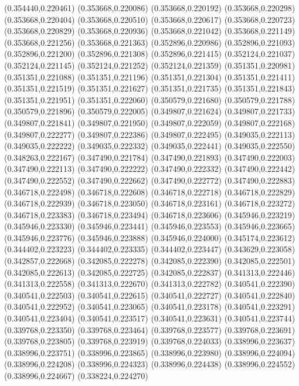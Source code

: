 (0.354440,0.220461)
(0.353668,0.220086)
(0.353668,0.220192)
(0.353668,0.220298)
(0.353668,0.220404)
(0.353668,0.220510)
(0.353668,0.220617)
(0.353668,0.220723)
(0.353668,0.220829)
(0.353668,0.220936)
(0.353668,0.221042)
(0.353668,0.221149)
(0.353668,0.221256)
(0.353668,0.221363)
(0.352896,0.220986)
(0.352896,0.221093)
(0.352896,0.221200)
(0.352896,0.221308)
(0.352896,0.221415)
(0.352124,0.221037)
(0.352124,0.221145)
(0.352124,0.221252)
(0.352124,0.221359)
(0.351351,0.220981)
(0.351351,0.221088)
(0.351351,0.221196)
(0.351351,0.221304)
(0.351351,0.221411)
(0.351351,0.221519)
(0.351351,0.221627)
(0.351351,0.221735)
(0.351351,0.221843)
(0.351351,0.221951)
(0.351351,0.222060)
(0.350579,0.221680)
(0.350579,0.221788)
(0.350579,0.221896)
(0.350579,0.222005)
(0.349807,0.221624)
(0.349807,0.221733)
(0.349807,0.221841)
(0.349807,0.221950)
(0.349807,0.222059)
(0.349807,0.222168)
(0.349807,0.222277)
(0.349807,0.222386)
(0.349807,0.222495)
(0.349035,0.222113)
(0.349035,0.222222)
(0.349035,0.222332)
(0.349035,0.222441)
(0.349035,0.222550)
(0.348263,0.222167)
(0.347490,0.221784)
(0.347490,0.221893)
(0.347490,0.222003)
(0.347490,0.222113)
(0.347490,0.222222)
(0.347490,0.222332)
(0.347490,0.222442)
(0.347490,0.222552)
(0.347490,0.222662)
(0.347490,0.222772)
(0.347490,0.222883)
(0.346718,0.222498)
(0.346718,0.222608)
(0.346718,0.222718)
(0.346718,0.222829)
(0.346718,0.222939)
(0.346718,0.223050)
(0.346718,0.223161)
(0.346718,0.223272)
(0.346718,0.223383)
(0.346718,0.223494)
(0.346718,0.223606)
(0.345946,0.223219)
(0.345946,0.223330)
(0.345946,0.223441)
(0.345946,0.223553)
(0.345946,0.223665)
(0.345946,0.223776)
(0.345946,0.223888)
(0.345946,0.224000)
(0.345174,0.223612)
(0.344402,0.223223)
(0.344402,0.223335)
(0.344402,0.223447)
(0.343629,0.223058)
(0.342857,0.222668)
(0.342085,0.222278)
(0.342085,0.222390)
(0.342085,0.222501)
(0.342085,0.222613)
(0.342085,0.222725)
(0.342085,0.222837)
(0.341313,0.222446)
(0.341313,0.222558)
(0.341313,0.222670)
(0.341313,0.222782)
(0.340541,0.222390)
(0.340541,0.222503)
(0.340541,0.222615)
(0.340541,0.222727)
(0.340541,0.222840)
(0.340541,0.222952)
(0.340541,0.223065)
(0.340541,0.223178)
(0.340541,0.223291)
(0.340541,0.223404)
(0.340541,0.223517)
(0.340541,0.223631)
(0.340541,0.223744)
(0.339768,0.223350)
(0.339768,0.223464)
(0.339768,0.223577)
(0.339768,0.223691)
(0.339768,0.223805)
(0.339768,0.223919)
(0.339768,0.224033)
(0.338996,0.223637)
(0.338996,0.223751)
(0.338996,0.223865)
(0.338996,0.223980)
(0.338996,0.224094)
(0.338996,0.224208)
(0.338996,0.224323)
(0.338996,0.224438)
(0.338996,0.224552)
(0.338996,0.224667)
(0.338224,0.224270)
